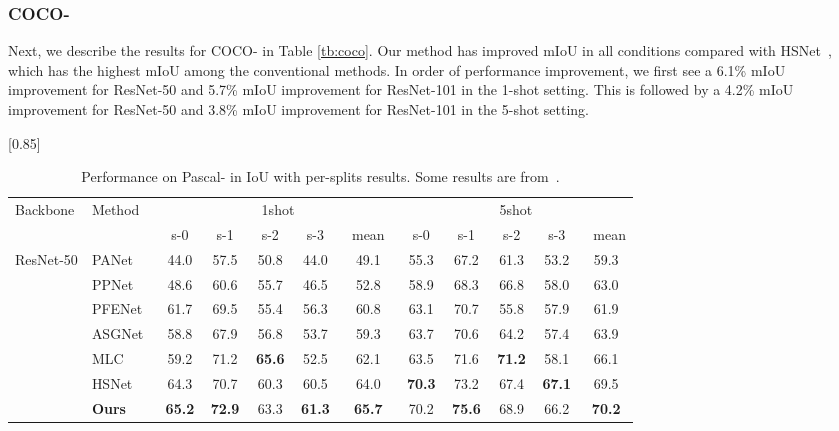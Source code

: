 \documentclass[runningheads]{llncs}
\begin{document}
\subsubsection{COCO-}
Next, we describe the results for COCO- in Table \ref{tb:coco}.
Our method has improved mIoU in all conditions compared with HSNet~\cite{HSNet}, which has the highest mIoU among the conventional methods.
In order of performance improvement, we first see a 6.1\% mIoU improvement for ResNet-50 and 5.7\% mIoU improvement for ResNet-101 in the 1-shot setting. This is followed by a 4.2\% mIoU improvement for ResNet-50 and 3.8\% mIoU improvement for ResNet-101 in the 5-shot setting.
\begin{table}[htb]
\centering
\caption{
   Performance on Pascal- in IoU with per-splits results. Some results are from~\cite{PANet, PPNet, PFENet, ASGNet, MLC, HSNet}.
   }
   \label{tb:pascal}
  \scalebox{0.85}[0.85]{ 
  \begin{tabular}{l|l|ccccc|ccccc} \toprule

    \multirow{2}{*}{Backbone} & \multirow{2}{*}{Method} & \multicolumn{5}{|c|}{1shot} & \multicolumn{5}{|c}{5shot} \\  
    
     & &\, s-0 \,  &\, s-1 \, &\, s-2 \, &\, s-3 \, &\, mean \, &\, s-0 \, &\, s-1 \, &\, s-2 \, &\, s-3 \, &\, mean  \\  \midrule
    
    \multirow{7}{*}{ResNet-50} 
    
    & PANet~\cite{PANet} 
    &44.0&57.5&50.8&44.0&49.1&55.3&67.2&61.3&53.2&59.3\\
    
    & PPNet~\cite{PPNet} 
    &48.6&60.6&55.7&46.5&52.8&58.9&68.3&66.8&58.0&63.0\\
    
    & PFENet~\cite{PFENet} &61.7&69.5&55.4&56.3&60.8&63.1&70.7&55.8&57.9&61.9\\
    
    & ASGNet~\cite{ASGNet} 
    &58.8&67.9&56.8&53.7&59.3&63.7&70.6&64.2&57.4&63.9\\

    & MLC~\cite{MLC} 
    &59.2&71.2&\textbf{65.6}&52.5&62.1&63.5&71.6&\textbf{71.2}&58.1&66.1\\
    
    & HSNet~\cite{HSNet}&64.3&70.7&60.3&60.5&64.0&\textbf{70.3}&73.2&67.4&\textbf{67.1}&69.5\\
    
    & \textbf{Ours} &\textbf{65.2}&\textbf{72.9}&63.3&\textbf{61.3}&\textbf{65.7}&70.2&\textbf{75.6}&68.9&66.2&\textbf{70.2}\\
        

\end{tabular}}
\end{table}
\end{document}
